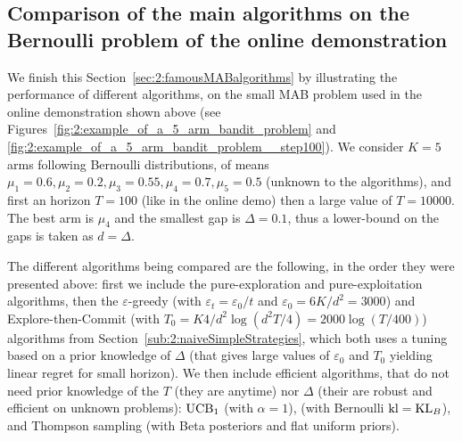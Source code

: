 


\subsection{Comparison of the main algorithms on the Bernoulli problem of the online demonstration}
\label{sub:2:shortNumericalExperiments}

We finish this Section~\ref{sec:2:famousMABalgorithms} by illustrating the performance of different algorithms, on the small MAB problem used in the online demonstration shown above (see Figures~\ref{fig:2:example_of_a_5_arm_bandit_problem} and \ref{fig:2:example_of_a_5_arm_bandit_problem__step100}).
We consider $K=5$ arms following Bernoulli distributions, of means $\mu_1=0.6,\mu_2=0.2,\mu_3=0.55,\mu_4=0.7,\mu_5=0.5$ (unknown to the algorithms), and first an horizon $T=100$ (like in the online demo) then a large value of $T=10000$.
The best arm is $\mu_4$ and the smallest gap is $\Delta = 0.1$, thus a lower-bound on the gaps is taken as $d=\Delta$.

The different algorithms being compared are the following, in the order they were presented above:
%
first we include the pure-exploration and
pure-exploitation algorithms,
then the $\varepsilon$-greedy (with $\varepsilon_t=\varepsilon_0/t$ and $\varepsilon_0=6K/d^2=3000$) and
Explore-then-Commit (with $T_0=K4/d^2 \log(d^2T/4)=2000\log(T/400)$) algorithms
from Section~\ref{sub:2:naiveSimpleStrategies}, which both uses a tuning based on a prior knowledge of $\Delta$ (that gives large values of $\varepsilon_0$ and $T_0$ yielding linear regret for small horizon).
%
We then include efficient algorithms, that do not need prior knowledge of the $T$ (they are anytime) nor $\Delta$ (their are robust and efficient on unknown problems):
$\mathrm{UCB}_1$ (with $\alpha=1$),
\klUCB{} (with Bernoulli $\mathrm{kl} = \mathrm{KL}_{B}$),
and Thompson sampling (with Beta posteriors and flat uniform priors).
%

